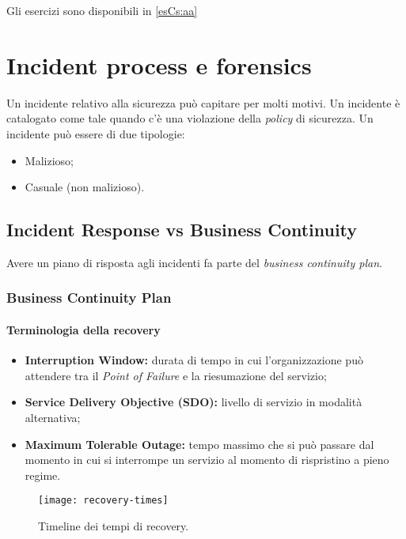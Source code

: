 Gli esercizi sono disponibili in \ref{esCs:aa}

\part{Incident process e forensics}

Un incidente relativo alla sicurezza può capitare per molti motivi. Un
incidente è catalogato come tale quando c'è una violazione della
\textit{policy} di sicurezza. Un incidente può essere di due tipologie:
\begin{itemize}
\item Malizioso;
\item Casuale (non malizioso).
\end{itemize}

\chapter{Incident Response vs Business Continuity}
\label{IRBC}

Avere un piano di risposta agli incidenti fa parte del \textit{business
continuity plan}.

\section{Business Continuity Plan}

\subsection{Terminologia della recovery}

\begin{itemize}
\item \textbf{Interruption Window:} durata di tempo in cui l'organizzazione
può attendere tra il \textit{Point of Failure} e la riesumazione del servizio;
\item \textbf{Service Delivery Objective (SDO):} livello di servizio in
modalità alternativa;
\item \textbf{Maximum Tolerable Outage:} tempo massimo che si può passare dal
momento in cui si interrompe un servizio al momento di rispristino a pieno
regime.
\end{itemize}

\begin{figure}
        \begin{center}
                \texttt{[image: recovery-times]}
        \end{center}
        \caption{Timeline dei tempi di recovery.}
        \label{fig:recovery:timeline}
\end{figure}

